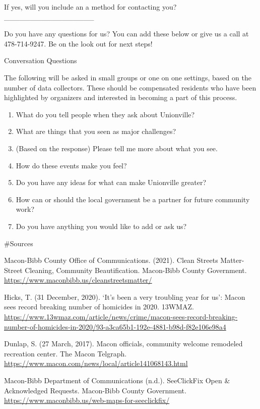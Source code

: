\documentclass[
]{article}
\begin{document}
If yes, will you include an a method for contacting you?
\_\_\_\_\_\_\_\_\_\_\_\_\_\_\_\_\_

Do you have any questions for us? You can add these below or give us a
call at 478-714-9247. Be on the look out for next steps!

Conversation Questions

The following will be asked in small groups or one on one settings,
based on the number of data collectors. These should be compensated
residents who have been highlighted by organizers and interested in
becoming a part of this process.

\begin{enumerate}
\def\labelenumi{\arabic{enumi}.}
\item
  What do you tell people when they ask about Unionville?
\item
  What are things that you seen as major challenges?
\item
  (Based on the response) Please tell me more about what you see.
\item
  How do these events make you feel?
\item
  Do you have any ideas for what can make Unionville greater?
\item
  How can or should the local government be a partner for future
  community work?
\item
  Do you have anything you would like to add or ask us?
\end{enumerate}

\#Sources

Macon-Bibb County Office of Communications. (2021). Clean Streets
Matter- Street Cleaning, Community Beautification. Macon-Bibb County
Government. \url{https://www.maconbibb.us/cleanstreetsmatter/}

Hicks, T. (31 December, 2020). `It's been a very troubling year for us':
Macon sees record breaking number of homicides in 2020. 13WMAZ.
\url{https://www.13wmaz.com/article/news/crime/macon-sees-record-breaking-number-of-homicides-in-2020/93-a3ca65b1-192e-4881-b98d-f82e106e98a4}

Dunlap, S. (27 March, 2017). Macon officials, community welcome
remodeled recreation center. The Macon Telgraph.
\url{https://www.macon.com/news/local/article141068143.html}

Macon-Bibb Department of Communications (n.d.). SeeClickFix Open \&
Acknowledged Requests. Macon-Bibb County Government.
\url{https://www.maconbibb.us/web-maps-for-seeclickfix/}
\end{document}
